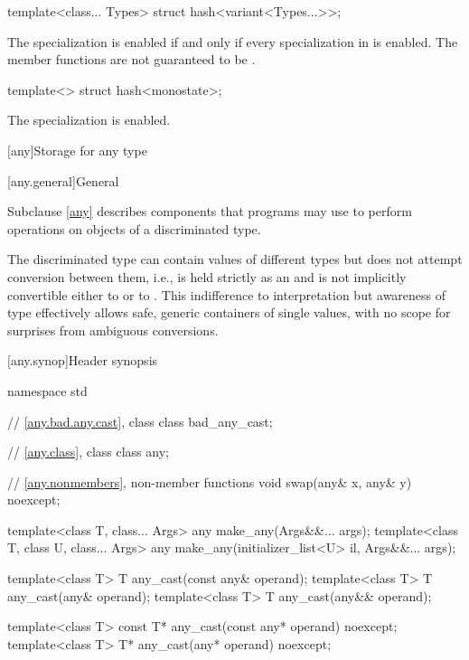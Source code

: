 %
\begin{itemdecl}
template<class... Types> struct hash<variant<Types...>>;
\end{itemdecl}

\begin{itemdescr}
\pnum
The specialization  is enabled
if and only if every specialization in  is enabled.
The member functions are not guaranteed to be .
\end{itemdescr}

%
\begin{itemdecl}
template<> struct hash<monostate>;
\end{itemdecl}

\begin{itemdescr}
\pnum
The specialization is enabled.
\end{itemdescr}


[any]{Storage for any type}

[any.general]{General}

\pnum
Subclause \ref{any} describes components that \Cpp{} programs may use to perform operations on objects of a discriminated type.

\pnum
\begin{note}
The discriminated type can contain values of different types but does not attempt conversion between them,
i.e.,  is held strictly as an  and is not implicitly convertible either to  or to .
This indifference to interpretation but awareness of type effectively allows safe, generic containers of single values, with no scope for surprises from ambiguous conversions.
\end{note}

[any.synop]{Header  synopsis}

%

\begin{codeblock}
namespace std {
  // \ref{any.bad.any.cast}, class 
  class bad_any_cast;

  // \ref{any.class}, class 
  class any;

  // \ref{any.nonmembers}, non-member functions
  void swap(any& x, any& y) noexcept;

  template<class T, class... Args>
    any make_any(Args&&... args);
  template<class T, class U, class... Args>
    any make_any(initializer_list<U> il, Args&&... args);

  template<class T>
    T any_cast(const any& operand);
  template<class T>
    T any_cast(any& operand);
  template<class T>
    T any_cast(any&& operand);

  template<class T>
    const T* any_cast(const any* operand) noexcept;
  template<class T>
    T* any_cast(any* operand) noexcept;
}
\end{codeblock}


